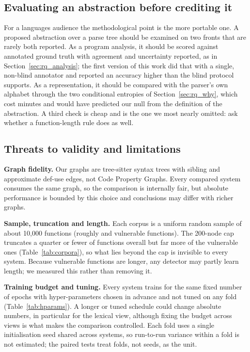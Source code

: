 \subsection{Evaluating an abstraction before crediting it}
For a languages audience the methodological point is the more portable one. A
proposed abstraction over a parse tree should be examined on two fronts that
are rarely both reported. As a program analysis, it should be scored against
annotated ground truth with agreement and uncertainty reported, as in
Section~\ref{sec:rq_analysis}; the first version of this work did that with a
single, non-blind annotator and reported an accuracy higher than the blind
protocol supports. As a representation, it should be compared with the parser's
own alphabet through the two conditional entropies of Section~\ref{sec:rq_why},
which cost minutes and would have predicted our null from the definition of the
abstraction. A third check is cheap and is the one we most nearly omitted: ask
whether a function-length rule does as well.

\subsection{Threats to validity and limitations}
\label{sec:limitations}

\textbf{Graph fidelity.} Our graphs are tree-sitter syntax trees with sibling and
approximate def-use edges, not Code Property Graphs. Every compared system
consumes the same graph, so the comparison is internally fair, but absolute
performance is bounded by this choice and conclusions may differ with richer
graphs.

\textbf{Sample, truncation and length.} Each corpus is a uniform random sample
of about 10{,}000 functions (roughly \numbigvulVuln{} and \numdiversevulVuln{}
vulnerable functions). The 200-node cap truncates a quarter or fewer of
functions overall but far more of the vulnerable ones (Table~\ref{tab:corpora}),
so what lies beyond the cap is invisible to every system. Because vulnerable
functions are longer, any detector may partly learn length; we measured this
rather than removing it.

\textbf{Training budget and tuning.} Every system trains for the same fixed
number of epochs with hyper-parameters chosen in advance and not tuned on any
fold (Table~\ref{tab:hparams}). A longer or tuned schedule could change absolute
numbers, in particular for the lexical view, although fixing the budget across
views is what makes the comparison controlled. Each fold uses a single
initialisation seed shared across systems, so run-to-run variance within a fold
is not estimated; the paired tests treat folds, not seeds, as the unit.

